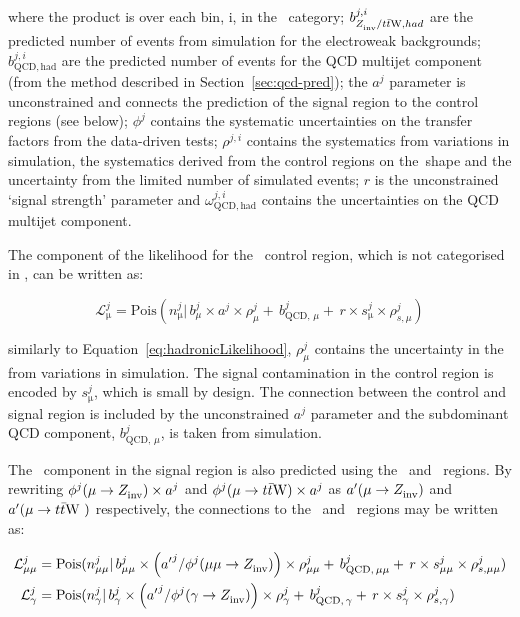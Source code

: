 where the product is over each \mht bin, i, in the \htcat~category; $b^{j,i}_{Z_{\rm inv}^{~}/t\bar{t}\text{W},had}$ are the predicted number 
of events from simulation for the electroweak backgrounds; 
$b^{j,i}_{\text{QCD},\mathrm{had}}$ are the predicted 
number of events for the QCD multijet component (from the method described in Section~\ref{sec:qcd-pred});
the $a^{j}$ parameter is unconstrained and connects the prediction of the signal region
to the control regions (see below); $\phi^{j}$ contains the systematic uncertainties on the 
transfer factors from the data-driven tests; $\rho^{j,i}$ contains the systematics from 
variations in simulation, the systematics derived from the control regions on the~\mht shape 
and the uncertainty from the limited number of simulated events; 
$r$ is the unconstrained `signal strength' parameter and $\omega_{\text{QCD},\mathrm{had}}^{j,i}$ 
contains the uncertainties on the QCD multijet component. 

The component of the likelihood for the \mj~control region, 
which is not categorised in \mht, can be written as:

\begin{equation}
\label{eq:muLikelihood}
\mathcal{L}^{j}_{\mathrm{\mu}} = \mathrm{Pois}(n^{j}_{\mathrm{\mu}} |\, b^{j}_{\mu}\times a^{j}\times\rho^{j}_{\mu} +\, b^{j}_{\text{QCD},\,\mu} + \,r \times s^{j}_{\mathrm{\mu}}\times\rho^{j}_{s,\mu})
\end{equation}

similarly to Equation~\ref{eq:hadronicLikelihood}, $\rho^{j}_{\mu}$ contains the uncertainty in the \htcat from variations in simulation. 
The signal contamination in the control region is encoded by $s^{j}_{\mathrm{\mu}}$, which is small by design. 
The connection between the control and signal region
is included by the unconstrained $a^{j}$ parameter and the 
subdominant QCD component, $b^{j}_{\text{QCD},\,\mu}$, is taken from simulation. 

The \zInv~component in the signal region is also predicted using the \gj~and \mmj~regions. 
By rewriting $\phi^{j}(\mu\rightarrow Z_{\rm inv}^{~})\times a^{j}$ and $\phi^{j}(\mu\rightarrow t\bar{t}\text{W})\times a^{j}$
as ${a'}(\mu\rightarrow Z_{\rm inv}^{~})$ and $a'(\mu\rightarrow t\bar{t}\text{W}~)$ respectively, the connections to the \gj~and \mmj~regions
may be written as:

\begin{align}
\label{eq:mumuGammaLikelihood}
\mathcal{L}^{j}_{\mathrm{\mu\mu}} &= \mathrm{Pois}(n^{j}_{\mathrm{\mu\mu}} |\, b^{j}_{\mu\mu}\times 
\left({a'}^{j}/\phi^{j}(\mu\mu\rightarrow Z_{\rm inv}^{~})\right)\times\rho^{j}_{\mu\mu} +\,b^{j}_{\text{QCD},\,\mu\mu} + \,r\times s^{j}_{\mathrm{\mu\mu}}\times\rho^{j}_{s,\mu\mu}) \\
\mathcal{L}^{j}_{\mathrm{\gamma}} &= \mathrm{Pois}(n^{j}_{\mathrm{\gamma}} |\, b^{j}_{\gamma}\times 
\left({a'}^{j}/\phi^{j}(\gamma\rightarrow Z_{\rm inv}^{~})\right)\times\rho^{j}_{\gamma} + \,b^{j}_{\text{QCD},\,\gamma} + \,r\times s^{j}_{\mathrm{\gamma}}\times\rho^{j}_{s,\gamma})
\end{align}


